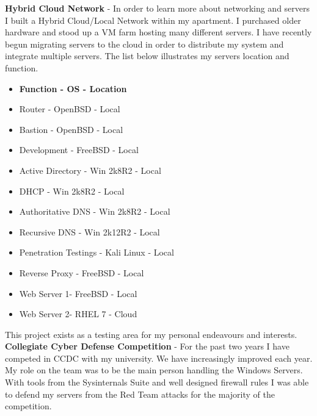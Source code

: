 \documentclass[10pt]{article} %
\begin{document}
\textbf{Hybrid Cloud Network} - In order to learn more about networking and servers I built a Hybrid Cloud/Local Network within my apartment. I
purchased older hardware and stood up a VM farm hosting many different servers. I have recently begun migrating servers to the cloud in order
to distribute my system and integrate multiple servers.
The list below illustrates my servers location and function.
\begin{itemize}
\item \textbf{Function - OS - Location}
\item Router - OpenBSD - Local
\item Bastion - OpenBSD - Local
\item Development - FreeBSD - Local
\item Active Directory - Win 2k8R2 - Local
\item DHCP - Win 2k8R2 - Local
\item Authoritative DNS - Win 2k8R2 - Local
\item Recursive DNS - Win 2k12R2 - Local
\item Penetration Testings - Kali Linux - Local
\item Reverse Proxy - FreeBSD - Local
\item Web Server 1- FreeBSD - Local
\item Web Server 2- RHEL 7 - Cloud
\end{itemize}

This project exists as a testing area for my personal endeavours and interests.  
\\

\textbf{Collegiate Cyber Defense Competition} - For the past two years I have competed in CCDC with my university. We have increasingly improved 
each year. My role on the team was to be the main person handling the Windows Servers. With tools from the Sysinternals Suite and well designed 
firewall rules I was able to defend my servers from the Red Team attacks for the majority of the competition.
\\
 
\end{document}

